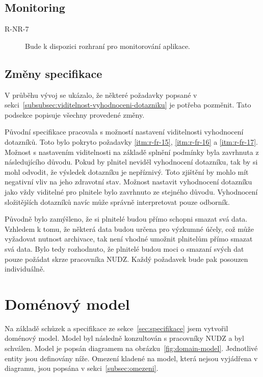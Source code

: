 \subsection{Monitoring}\label{subsec:monitoring}

\begin{description}
    \item[R-NR-7]
    Bude k dispozici rozhraní pro monitorování aplikace.
\end{description}

\subsection{Změny specifikace}\label{subsec:zmeny-specifikace}

V průběhu vývoj se ukázalo, že některé požadavky popsané v sekci~\ref{subsubsec:viditelnost-vyhodnoceni-dotazniku} je potřeba pozměnit.
Tato podsekce popisuje všechny provedené změny.

Původní specifikace pracovala s možností nastavení viditelnosti vyhodnocení dotazníků.
Toto bylo pokryto požadavky \ref{itm:r-fr-15}, \ref{itm:r-fr-16} a \ref{itm:r-fr-17}.
Možnost s nastavením viditelnosti na základě splnění podmínky byla zavrhnuta z následujícího důvodu.
Pokud by plnitel neviděl vyhodnocení dotazníku, tak by si mohl odvodit, že výsledek dotazníku je nepříznivý.
Toto zjištění by mohlo mít negativní vliv na jeho zdravotní stav.
Možnost nastavit vyhodnocení dotazníku jako vždy viditelné pro plnitele bylo zavrhnuto ze stejného důvodu.
Vyhodnocení složitějších dotazníků navíc může správně interpretovat pouze odborník.

Původně bylo zamýšleno, že si plnitelé budou přímo schopni smazat svá data.
Vzhledem k tomu, že některá data budou určena pro výzkumné účely, což může vyžadovat nutnost archivace, tak není vhodné umožnit plnitelům přímo smazat svá data.
Bylo tedy rozhodnuto, že plnitelé budou moci o smazaní svých dat pouze požádat skrze pracovníka NUDZ\@.
Každý požadavek bude pak posouzen individuálně.


\section{Doménový model}\label{sec:domenovy-model}

Na základě schůzek a specifikace ze sekce~\ref{sec:specifikace} jsem vytvořil doménový model.
Model byl následně konzultován s pracovníky NUDZ a byl schválen.
Model je popsán diagramem na obrázku~\ref{fig:domain-model}.
Jednotlivé entity jsou definovány níže.
Omezení kladené na model, která nejsou vyjádřena v diagramu, jsou popsána v sekci~\ref{subsec:omezeni}.

